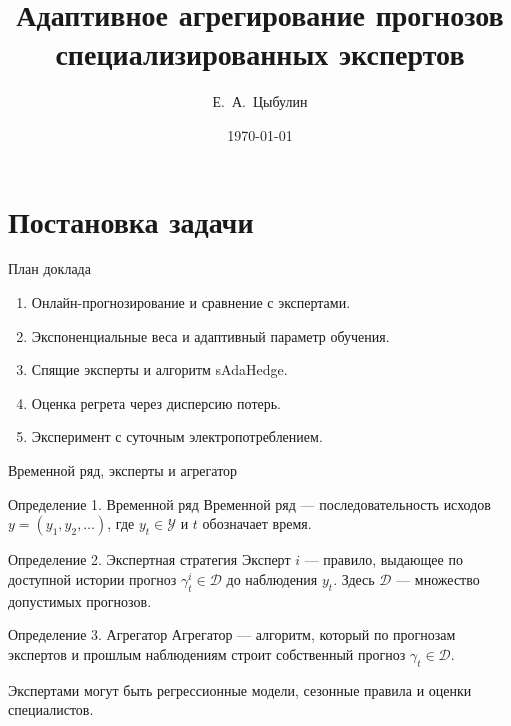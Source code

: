 \documentclass[11pt,aspectratio=169]{beamer}
\title[Агрегирование прогнозов]{Адаптивное агрегирование прогнозов специализированных экспертов}
\author{Е.~А.~Цыбулин}
\institute[МГУ]{МГУ имени М.~В.~Ломоносова}
\date{\today}
\begin{document}
\begin{frame}
  \titlepage
\end{frame}
\section{Постановка задачи}
\begin{frame}{План доклада}
  \begin{enumerate}
    \item Онлайн-прогнозирование и сравнение с экспертами.
    \item Экспоненциальные веса и адаптивный параметр обучения.
    \item Спящие эксперты и алгоритм sAdaHedge.
    \item Оценка регрета через дисперсию потерь.
    \item Эксперимент с суточным электропотреблением.
  \end{enumerate}
\end{frame}
\begin{frame}{Временной ряд, эксперты и агрегатор}
  \begin{block}{Определение 1. Временной ряд}
    Временной ряд --- последовательность исходов
    $y=(y_1,y_2,\ldots)$, где $y_t\in\mathcal Y$ и $t$ обозначает время.
  \end{block}
  \begin{block}{Определение 2. Экспертная стратегия}
    Эксперт $i$ --- правило, выдающее по доступной истории прогноз
    $\gamma_t^i\in\mathcal D$ до наблюдения $y_t$.
    Здесь $\mathcal D$ --- множество допустимых прогнозов.
  \end{block}
  \begin{block}{Определение 3. Агрегатор}
    Агрегатор --- алгоритм, который по прогнозам экспертов и прошлым
    наблюдениям строит собственный прогноз $\gamma_t\in\mathcal D$.
  \end{block}
  \par\vfill{\scriptsize Экспертами могут быть регрессионные модели, сезонные правила и оценки специалистов.\par}
\end{frame}
\end{document}

